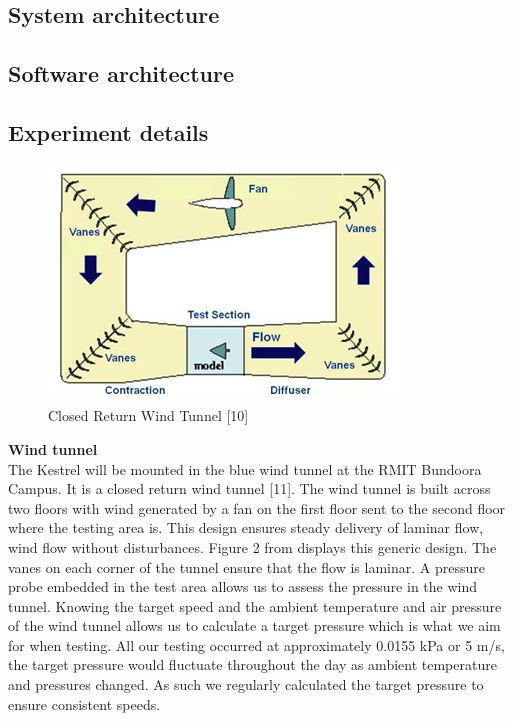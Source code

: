     \subsection{System architecture}

    \subsection{Software architecture}

    \subsection{Experiment details}
    \setlength{\intextsep}{0pt}
    \begin{figure}
        \includegraphics[width=\textwidth/2]{./Resources/Fig2_wind_tunnel_design.jpg}
        \caption{\label{fig:figure 2} Closed Return Wind Tunnel [10]}
    \end{figure}
    \quad\textbf{Wind tunnel}\\
    The Kestrel will be mounted in the blue wind tunnel at the RMIT
    Bundoora Campus. It is a closed return wind tunnel [11]. The
    wind tunnel is built across two floors with wind generated by a fan on
    the first floor sent to the second floor where the testing area is.
    This design ensures steady delivery of laminar flow, wind flow without
    disturbances. Figure 2 from displays this generic design. The vanes on
    each corner of the tunnel ensure that the flow is laminar. 
    \vspace{\baselineskip}
    A pressure probe embedded in the test area allows us to assess the
    pressure in the wind tunnel. Knowing the target speed and the ambient
    temperature and air pressure of the wind tunnel allows us to calculate
    a target pressure which is what we aim for when testing. All our testing
    occurred at approximately 0.0155 kPa or 5 m/s, the target pressure would
    fluctuate throughout the day as ambient temperature and pressures
    changed. As such we regularly calculated the target pressure to ensure
    consistent speeds.
    \vspace{\baselineskip}

